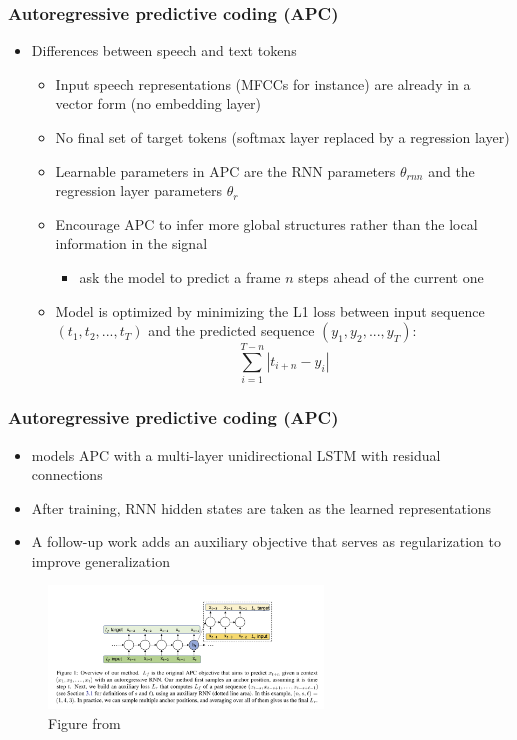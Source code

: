 \documentclass[table]{beamer}
\begin{document}

\begin{frame}
\frametitle{Autoregressive predictive coding (APC)}
\begin{itemize}
\item Differences between speech and text tokens
		\begin{itemize}
			\item Input speech representations (MFCCs for instance) are already in a vector form (no embedding layer)
			\item No final set of target tokens (softmax layer replaced by a regression layer)
			\item Learnable parameters in APC are the RNN parameters $\theta_{rnn}$ and the regression layer parameters $\theta_r$
			\item Encourage APC to infer more global structures rather than the local information in the signal
				\begin{itemize}
				\item ask the model to predict a frame $n$ steps ahead of the current one
				\end{itemize}
			\item Model is optimized by minimizing the L1 loss between input sequence $(t_1,t_2,...,t_T )$ and the predicted sequence $(y_1,y_2,...,y_T )$:
				\begin{equation}
				\sum_{i=1}^{T-n} | t_{i+n}-y_i |
				\end{equation}			
		\end{itemize} 
\end{itemize} 
\end{frame}




\begin{frame}
\frametitle{Autoregressive predictive coding (APC)}
\begin{itemize}
\item  \cite{DBLP:journals/corr/abs-1904-03240} models APC with a multi-layer unidirectional LSTM with residual connections
\item After training, RNN hidden states are taken as the learned representations
\item A follow-up work \citep{chung2020improved} adds an auxiliary objective that serves as regularization to  improve generalization 
\end{itemize} 
\begin{figure}
	\includegraphics[width=0.65\textwidth]{regularization}
	\caption{Figure from  \citep{chung2020improved}}
\end{figure}

\end{frame}
\end{document}
